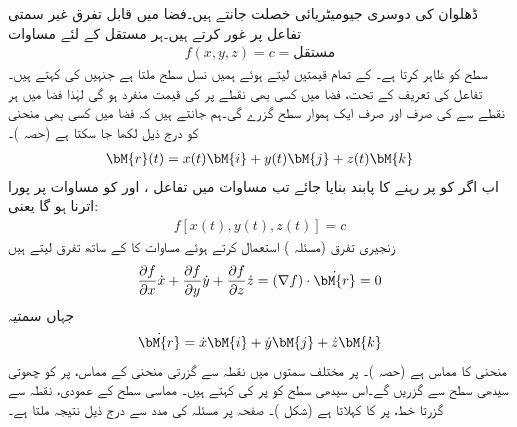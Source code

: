 ڈھلوان کی دوسری جیومیٹریائی خصلت جانتے ہیں۔فضا میں قابل تفرق غیر سمتی تفاعل  پر غور کرتے ہیں۔ہر مستقل  کے لئے مساوات
\begin{align}\label{مساوات_الاحصاء_سمتی_تفرق_چ}
f(x,y,z)=c=\text{مستقل}
\end{align}
 سطح  کو ظاہر کرتا ہے۔ کے تمام قیمتیں لیتے ہوئے ہمیں نسل سطح ملتا ہے جنہیں  کی  کہتے ہیں۔ تفاعل کی تعریف کے تحت، فضا میں کسی بھی نقطے پر   کی قیمت منفرد ہو گی لہٰذا فضا میں ہر نقطے سے  کی صرف اور صرف ایک ہموار سطح گزرے گی۔ہم جانتے ہیں کہ فضا میں کسی بھی منحنی  کو درج ذیل لکھا جا سکتا ہے (حصہ )۔
\begin{align}\label{مساوات_الاحصاء_سمتی_تفرق_ح}
\bM{r}(t)=x(t)\bM{i}+y(t)\bM{j}+z(t)\bM{k}
\end{align}
اب اگر  کو  پر رہنے کا پابند بنایا جائے تب مساوات  میں تفاعل ،  اور  کو مساوات  پر پورا اترنا ہو گا یعنی:
\begin{align}\label{مساوات_الاحصاء_سمتی_تفرق_خ}
f[x(t),y(t),z(t)]=c
\end{align}
زنجیری تفرق  (مسئلہ ) استعمال کرتے ہوئے مساوات  کا  کے ساتھ تفرق لیتے ہیں
\begin{align}\label{مساوات_الاحصاء_سمتی_تفرق_د}
\frac{\partial f}{\partial x}\dot{x}+\frac{\partial f}{\partial y}\dot{y}+\frac{\partial f}{\partial z}\dot{z}=(\nabla f)\cdot \dot{\bM{r}}=0
\end{align}
جہاں سمتیہ
\begin{align*}
\dot{\bM{r}}=\dot{x}\bM{i}+\dot{y}\bM{j}+\dot{z}\bM{k}
\end{align*}
منحنی  کا مماس ہے (حصہ )۔  پر مختلف سمتوں میں نقطہ  سے  گزرتی منحنی کے مماس،  پر  کو چھوتی سیدھی سطح سے گزریں گے۔اس سیدھی سطح کو  پر  کی  کہتے ہیں۔ مماسی سطح کے عمودی، نقطہ  سے گزرتا خط،  پر  کا  کہلاتا ہے (شکل )۔ صفحہ  پر مسئلہ  کی مدد سے درج ذیل نتیجہ ملتا ہے۔
